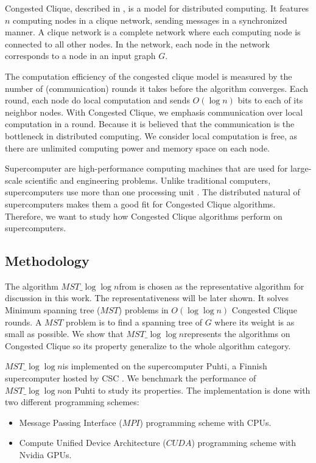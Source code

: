 \documentclass[english, 12pt, a4paper, elec, utf8, a-2b, online]{aaltothesis}
\newcommand{\mstalgo}{$MST\_\log\log{n}$}
\begin{document}
Congested Clique, described in \cite{powerCongestClique}, is a model for distributed computing. 
It features $n$ computing nodes in a clique network, sending messages in a synchronized manner. A clique network is a complete network where each computing node is connected to all other nodes. 
In the network, each node in the network corresponds to a node in an input graph $G$. 

The computation efficiency of the congested clique model is measured by the number of (communication) rounds it takes before the algorithm converges. Each round, each node do local computation and sends $O(\log{n})$ bits to each of its neighbor nodes. 
With Congested Clique, we emphasis communication over local computation in a round. Because it is believed that the communication is the bottleneck in distributed computing. We consider local computation is free, as there are unlimited computing power and memory space on each node.

Supercomputer are high-performance computing machines that are used for large-scale scientific and engineering problems. Unlike traditional computers, supercomputers use more than one processing unit \cite{IBMsupercomputing}. The distributed natural of supercomputers makes them a good fit for Congested Clique algorithms. Therefore, we want to study how Congested Clique algorithms perform on supercomputers. 

\subsection{Methodology}
The algorithm \mstalgo from \cite{MSTLogLogn} is chosen as the representative algorithm for discussion in this work. The representativeness will be later shown. It solves Minimum spanning tree ($MST$) problems in $O(\log{\log{n}})$ Congested Clique rounds. A $MST$ problem is to find a spanning tree of $G$ where its weight is as small as possible.  We show that \mstalgo represents the algorithms on Congested Clique so its property generalize to the whole algorithm category. 

\mstalgo is implemented on the supercomputer Puhti, a Finnish supercomputer hosted by CSC \cite{Puhti}. We benchmark the performance of \mstalgo on Puhti to study its properties. The implementation is done with two different programming schemes:
\begin{itemize}
	\item[--] Message Passing Interface ($MPI$) programming scheme with CPUs.
	\item[--] Compute Unified Device Architecture ($CUDA$) programming scheme with Nvidia GPUs.
\end{itemize}
\end{document}
